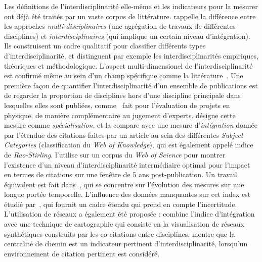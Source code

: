 {Les définitions de l'interdisciplinarité elle-même et les indicateurs pour la mesurer ont déjà été traités par un vaste corpus de littérature. \cite{huutoniemi2010analyzing} rappelle la différence entre les approches \emph{multi-disciplinaires} (une agrégation de travaux de différentes disciplines) et \emph{interdisciplinaires} (qui implique un certain niveau d'intégration). Ils construisent un cadre qualitatif pour classifier différents types d'interdisciplinarité, et distinguent par exemple les interdisciplinarités empiriques, théoriques et méthodologique. L'aspect multi-dimensionel de l'interdisciplinarité est confirmé même au sein d'un champ spécifique comme la littérature~\cite{austin1996defining}. Une première façon de quantifier l'interdisciplinarité d'un ensemble de publications est de regarder la proportion de disciplines hors d'une discipline principale dans lesquelles elles sont publiées, comme~\cite{rinia2002impact} fait pour l'évaluation de projets en physique, de manière complémentaire au jugement d'experts. \cite{porter2007measuring} désigne cette mesure comme \emph{spécialisation}, et la compare avec une mesure d'\emph{intégration} donnée par l'étendue des citations faites par un article au sein des différentes \emph{Subject Categories} (classification du \emph{Web of Knowledge}), qui est également appelé indice de \emph{Rao-Stirling}. \cite{lariviere2010relationship} l'utilise sur un corpus du \emph{Web of Science} pour montrer l'existence d'un niveau d'interdisciplinarité intermédiaire optimal pour l'impact en termes de citations sur une fenêtre de 5 ans post-publication. Un travail équivalent est fait dans~\cite{lariviere201410}, qui se concentre sur l'évolution des mesures sur une longue portée temporelle. L'influence des données manquantes sur cet index est étudié par~\cite{moreno2016uncertainty}, qui fournit un cadre étendu qui prend en compte l'incertitude. L'utilisation de réseaux a également été proposée : \cite{porter2009science} combine l'indice d'intégration avec une technique de cartographie qui consiste en la visualisation de réseaux synthétiques construits par les co-citations entre disciplines. \cite{leydesdorff2007betweenness} montre que la centralité de chemin est un indicateur pertinent d'interdisciplinarité, lorsqu'un environnement de citation pertinent est considéré.
}



